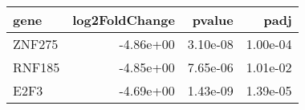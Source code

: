 \begin{tabular}{lrrr}
\toprule
  gene &  log2FoldChange &   pvalue &     padj \\
\midrule
ZNF275 &       -4.86e+00 & 3.10e-08 & 1.00e-04 \\
RNF185 &       -4.85e+00 & 7.65e-06 & 1.01e-02 \\
  E2F3 &       -4.69e+00 & 1.43e-09 & 1.39e-05 \\
\bottomrule
\end{tabular}
